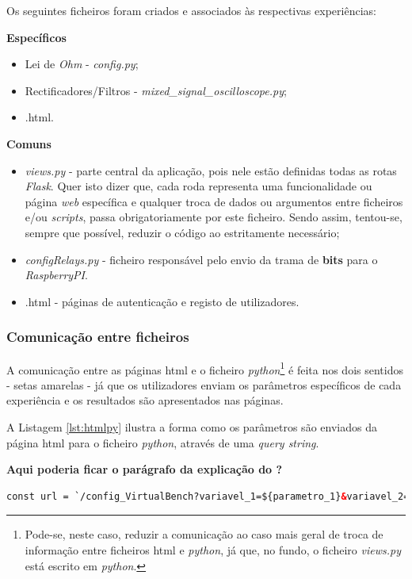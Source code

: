Os seguintes ficheiros foram criados e associados às respectivas experiências:

\textbf{Específicos}
\begin{itemize}
	\item Lei de \textit{Ohm} - \textit{config.py};
	\item Rectificadores/Filtros - \textit{mixed\_signal\_oscilloscope.py};
	\item {}.html.
\end{itemize}

\textbf{Comuns}
\begin{itemize}
	\item \textit{views.py} - parte central da aplicação, pois nele estão definidas todas as rotas \textit{Flask}. Quer isto dizer que, cada roda representa uma funcionalidade ou página \textit{web} específica e qualquer troca de dados ou argumentos entre ficheiros e/ou \textit{scripts}, passa obrigatoriamente por este ficheiro. Sendo assim, tentou-se, sempre que possível, reduzir o código ao estritamente necessário;
	\item \textit{configRelays.py} - ficheiro responsável pelo envio da trama de \textbf{bits} para o \textit{RaspberryPI}.
	\item {}.html - páginas de autenticação e registo de utilizadores.
\end{itemize}

\subsubsection{Comunicação entre ficheiros}
\label{sec:comunicacaoentrefich}
A comunicação entre as páginas \acrshort{html} e o ficheiro \textit{python}\footnote{Pode-se, neste caso, reduzir a comunicação ao caso mais geral de troca de informação entre ficheiros \acrshort{html} e \textit{python}, já que, no fundo, o ficheiro \textit{views.py} está escrito em \textit{python}.} é feita nos dois sentidos - setas amarelas - já que os utilizadores enviam os parâmetros específicos de cada experiência e os resultados são apresentados nas páginas. 

A Listagem \ref{lst:htmlpy} ilustra a forma como os parâmetros são enviados da página \acrshort{html} para o ficheiro \textit{python}, através de uma \textit{query string}.

\textbf{Aqui poderia ficar o parágrafo da explicação do ?}

\begin{minipage}{0.9\linewidth}
	\begin{lstlisting}[language=html, escapechar=|, caption=Envio de parâmetros \acrshort{html} $\rightarrow$ \textit{views.py}, label=lst:htmlpy]
	const url = `/config_VirtualBench?variavel_1=${parametro_1}&variavel_2=${parametro_2}&variavel_3=${parametro_3}`; |\label{line:parametros}|
	\end{lstlisting}
\end{minipage}

